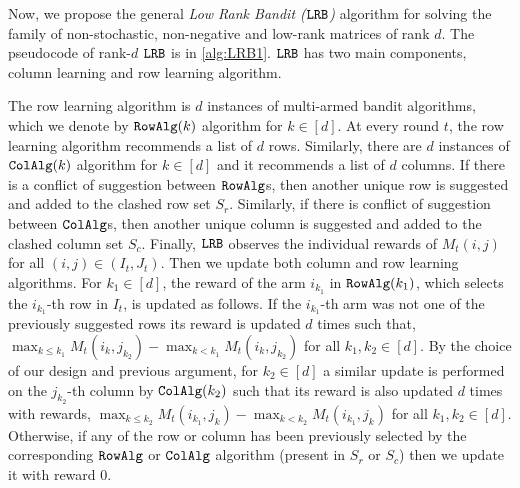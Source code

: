 
Now, we propose the general \emph{Low Rank Bandit (${\tt LRB}$)} algorithm for solving the family of non-stochastic, non-negative and low-rank matrices of rank $d$. The pseudocode of rank-$d$ ${\tt LRB}$ is in \cref{alg:LRB1}. ${\tt LRB}$ has two main components, column learning and row learning algorithm. 

The row learning algorithm is $d$ instances of multi-armed bandit algorithms, which we denote by ${\tt RowAlg}(k)$ algorithm for $k \in [d]$. At every round $t$, the row learning algorithm recommends a list of $d$ rows. Similarly, there are $d$ instances of ${\tt ColAlg}(k)$ algorithm for $k \in [d]$ and it recommends a list of $d$ columns. If there is a conflict of suggestion between ${\tt RowAlg}$s, then another unique row is suggested and added to the clashed row set $S_r$. Similarly, if there is conflict of suggestion between ${\tt ColAlg}$s, then another unique column is suggested and added to the clashed column set  $S_c$. Finally, ${\tt LRB}$ observes the individual rewards of $M_t(i,j)$ for all $(i,j)\in (I_t, J_t)$. Then we update both column and row learning algorithms. For $k_1 \in [d]$, the reward of the arm $i_{k_1}$ in ${\tt RowAlg}(k_1)$, which selects the $i_{k_1}$-th row in $I_t$, is updated as follows. If the $i_{k_1}$-th arm was not one of the previously suggested rows its reward is updated $d$ times such that, $\max_{k \leq k_1} M_t(i_k, j_{k_2}) - \max_{k < k_1} M_t(i_k, j_{k_2})$ for all $k_1,k_2 \in [d]$. By the choice of our design and previous argument, for $k_2 \in [d]$ a similar update is performed on the $j_{k_2}$-th column by ${\tt ColAlg}(k_2)$ such that its reward is also updated $d$ times with rewards, $\max_{k \leq k_2} M_t(i_{k_1}, j_k)  - \max_{k < k_2} M_t(i_{k_1}, j_k)$ for all $k_1,k_2 \in [d]$. Otherwise, if any of the row or column has been previously selected by the corresponding ${\tt RowAlg}$ or ${\tt ColAlg}$ algorithm (present in $S_r$ or $S_c$) then we update it with reward $0$.




